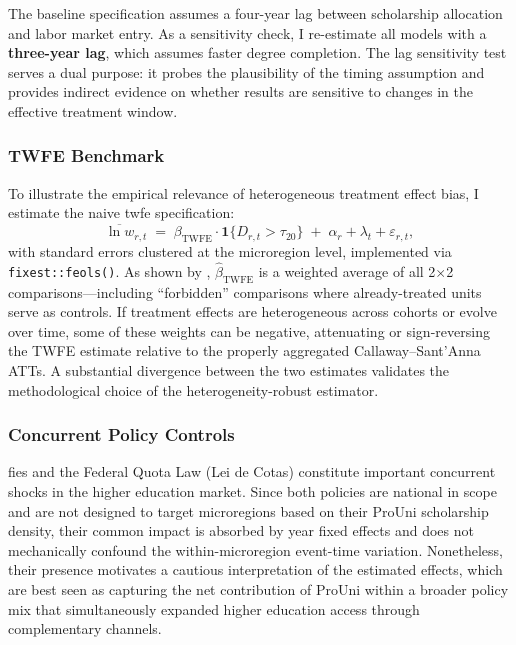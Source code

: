 The baseline specification assumes a four-year lag between scholarship allocation and labor market entry. As a sensitivity check, I re-estimate all models with a \textbf{three-year lag}, which assumes faster degree completion. The lag sensitivity test serves a dual purpose: it probes the plausibility of the timing assumption and provides indirect evidence on whether results are sensitive to changes in the effective treatment window.


\subsubsection{TWFE Benchmark}
\label{sec:robustness_twfe}

To illustrate the empirical relevance of heterogeneous treatment effect bias, I estimate the naive \acrshort{twfe} specification:
\begin{equation}
    \overline{\ln w}_{r,t}
    \;=\;
    \beta_{\text{TWFE}} \cdot \mathbf{1}\{D_{r,t} > \tau_{20}\}
    \;+\;
    \alpha_r + \lambda_t + \varepsilon_{r,t},
    \label{eq:twfe_benchmark}
\end{equation}
with standard errors clustered at the microregion level, implemented via \texttt{fixest::feols()}. As shown by , $\hat{\beta}_{\text{TWFE}}$ is a weighted average of all 2$\times$2 comparisons---including ``forbidden'' comparisons where already-treated units serve as controls. If treatment effects are heterogeneous across cohorts or evolve over time, some of these weights can be negative, attenuating or sign-reversing the TWFE estimate relative to the properly aggregated Callaway--Sant'Anna ATTs. A substantial divergence between the two estimates validates the methodological choice of the heterogeneity-robust estimator.


\subsubsection{Concurrent Policy Controls}
\label{sec:robustness_fies}

\acrshort{fies} and the Federal Quota Law (Lei de Cotas) constitute important concurrent shocks in the higher education market. Since both policies are national in scope and are not designed to target microregions based on their ProUni scholarship density, their common impact is absorbed by year fixed effects and does not mechanically confound the within-microregion event-time variation. Nonetheless, their presence motivates a cautious interpretation of the estimated effects, which are best seen as capturing the net contribution of ProUni within a broader policy mix that simultaneously expanded higher education access through complementary channels.
